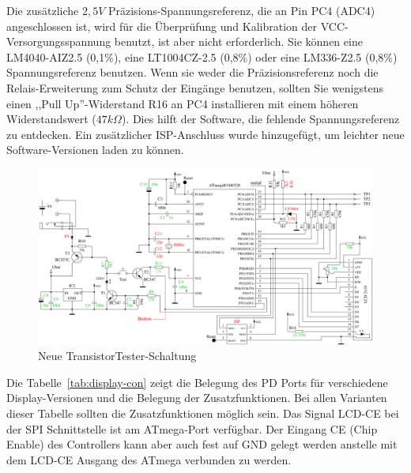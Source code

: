 Die zusätzliche \(2,5V\) Präzisions-Spannungsreferenz, die an Pin PC4 (ADC4) angeschlossen ist,
wird für die Überprüfung und Kalibration der VCC-Versorgungsspannung benutzt, ist aber nicht
erforderlich.
Sie können eine LM4040-AIZ2.5 (0,1\%),
eine LT1004CZ-2.5 (0,8\%) oder eine LM336-Z2.5 (0,8\%) Spannungsreferenz benutzen.
Wenn sie weder die Präzisionsreferenz noch die Relais-Erweiterung zum Schutz der Eingänge benutzen,
sollten Sie wenigstens einen ,,Pull Up''-Widerstand R16 an PC4 installieren mit einem
höheren Widerstandswert (\(47k\Omega\)).
Dies hilft der Software, die fehlende Spannungsreferenz zu entdecken.
Ein zusätzlicher ISP-Anschluss wurde hinzugefügt, um leichter neue Software-Versionen
laden zu können.

\begin{figure}[H]
\centering
\includegraphics[width=1.0\textwidth]{../FIG/ttester.pdf}
\caption{Neue TransistorTester-Schaltung}
\label{fig:ttester}
\end{figure}

Die Tabelle~\ref{tab:display-con} zeigt die Belegung des PD Ports für verschiedene Display-Versionen
und die Belegung der Zusatzfunktionen.
Bei allen Varianten dieser Tabelle sollten die Zusatzfunktionen möglich sein.
Das Signal LCD-CE bei der SPI Schnittstelle ist am ATmega-Port verfügbar. Der Eingang CE (Chip Enable) des
Controllers kann aber auch fest auf GND gelegt werden anstelle mit dem LCD-CE Ausgang des ATmega verbunden zu werden.


